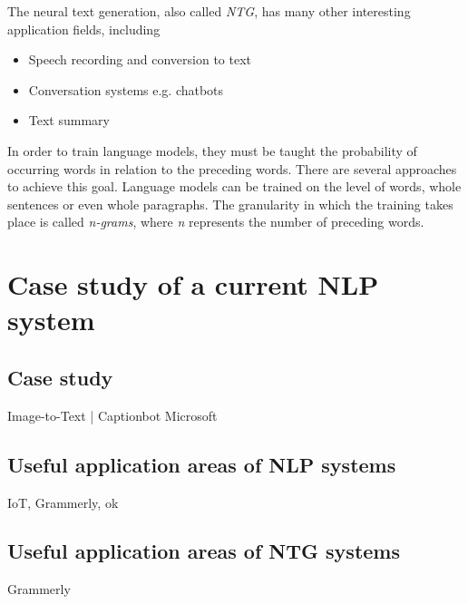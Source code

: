 The neural text generation, also called \textit{NTG}, has many other interesting application fields, including
\begin{itemize}
\item Speech recording and conversion to text
\item Conversation systems e.g. chatbots
\item Text summary
\end{itemize} 

In order to train language models, they must be taught the probability of occurring words in relation to the preceding words. There are several approaches to achieve this goal. Language models can be trained on the level of words, whole sentences or even whole paragraphs. The granularity in which the training takes place is called \textit{n-grams}, where \textit{n} represents the number of preceding words.

\section{Case study of a current NLP system}

\subsection{Case study}

Image-to-Text | Captionbot Microsoft

\subsection{Useful application areas of NLP systems}

IoT, Grammerly, ok

\subsection{Useful application areas of NTG systems}

Grammerly
